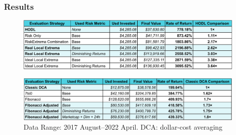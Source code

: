 
\begin{frame}
  \frametitle{Results}
  \centering

  \begin{figure}
    \includegraphics[width=\textwidth]{img/long-term-table.pdf}
  \end{figure}

  \smallskip

  \begin{figure}
  \includegraphics[width=\textwidth]{img/dca-table.pdf}
  \caption{\footnotesize{Data Range: 2017 August--2022 April. DCA: dollar-cost averaging}}
  \end{figure}
\end{frame}




